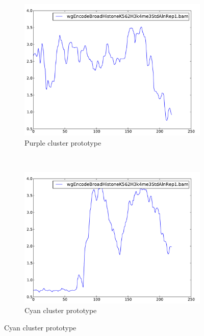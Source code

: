 \documentclass[parskip]{cs4rep}
\begin{document}
\begin{figure}[t]
    \centering
    \begin{subfigure}[b]{0.22\textwidth}
        \includegraphics[width=\textwidth]{figures/evaluation/exon_stretching/cluster-2.pdf}
        \caption{Purple cluster prototype}
        \label{fig:evaluation:exon_stretching:clusters:1:prototype}
    \end{subfigure}
    ~
    \begin{subfigure}[b]{0.22\textwidth}
        \includegraphics[width=\textwidth]{figures/evaluation/exon_stretching/cluster-1.pdf}
        \caption{Cyan cluster prototype}
        \label{fig:evaluation:exon_stretching:clusters:2:prototype}
    \end{subfigure}

\end{figure}
\end{document}
